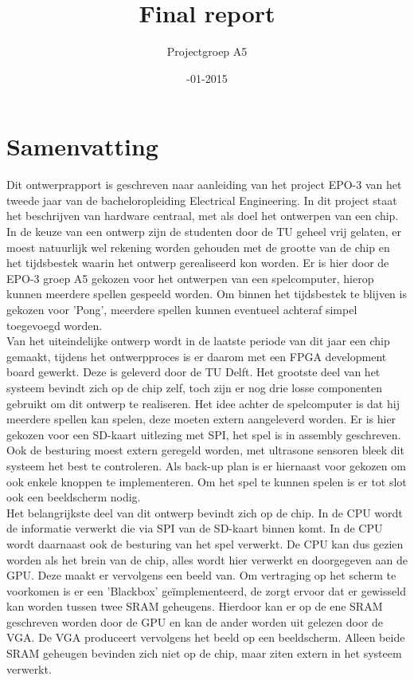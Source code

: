 \documentclass[oneside,dutch]{tudelft-report}
\title{\sffamily\Huge Final report}
\author{\sffamily\Large Projectgroep A5}
\affiliation{\sffamily TU Delft}
\date{\sffamily 14-01-2015}
\begin{document}
\maketitle

\chapter{Samenvatting}
Dit ontwerprapport is geschreven naar aanleiding van het project EPO-3 van het tweede jaar van de bacheloropleiding Electrical Engineering. In dit project staat het beschrijven van hardware centraal, met als doel het ontwerpen van een chip. In de keuze van een ontwerp zijn de studenten door de TU geheel vrij gelaten, er moest natuurlijk wel rekening worden gehouden met de grootte van de chip en het tijdsbestek waarin het ontwerp gerealiseerd kon worden. Er is hier door de EPO-3 groep A5 gekozen voor het ontwerpen van een spelcomputer, hierop kunnen meerdere spellen gespeeld worden. Om binnen het tijdsbestek te blijven is gekozen voor 'Pong', meerdere spellen kunnen eventueel achteraf simpel toegevoegd worden.\\

Van het uiteindelijke ontwerp wordt in de laatste periode van dit jaar een chip gemaakt, tijdens het ontwerpproces is er daarom met een FPGA development board gewerkt. Deze is geleverd door de TU Delft. Het grootste deel van het systeem bevindt zich op de chip zelf, toch zijn er nog drie losse componenten gebruikt om dit ontwerp te realiseren. Het idee achter de spelcomputer is dat hij meerdere spellen kan spelen, deze moeten extern aangeleverd worden. Er is hier gekozen voor een SD-kaart uitlezing met SPI, het spel is in assembly geschreven. Ook de besturing moest extern geregeld worden, met ultrasone sensoren bleek dit systeem het best te controleren. Als back-up plan is er hiernaast voor gekozen om ook enkele knoppen te implementeren. Om het spel te kunnen spelen is er tot slot ook een beeldscherm nodig.\\

Het belangrijkste deel van dit ontwerp bevindt zich op de chip. In de CPU wordt de informatie verwerkt die via SPI van de SD-kaart binnen komt. In de CPU wordt daarnaast ook de besturing van het spel verwerkt. De CPU kan dus gezien worden als het brein van de chip, alles wordt hier verwerkt en doorgegeven aan de GPU. Deze maakt er vervolgens een beeld van. Om vertraging op het scherm te voorkomen is er een 'Blackbox' geïmplementeerd, de zorgt ervoor dat er gewisseld kan worden tussen twee SRAM geheugens. Hierdoor kan er op de ene SRAM geschreven worden door de GPU en kan de ander worden uit gelezen door de VGA. De VGA produceert vervolgens het beeld op een beeldscherm. Alleen beide SRAM geheugen bevinden zich niet op de chip, maar ziten extern in het systeem verwerkt.\\
\end{document}
